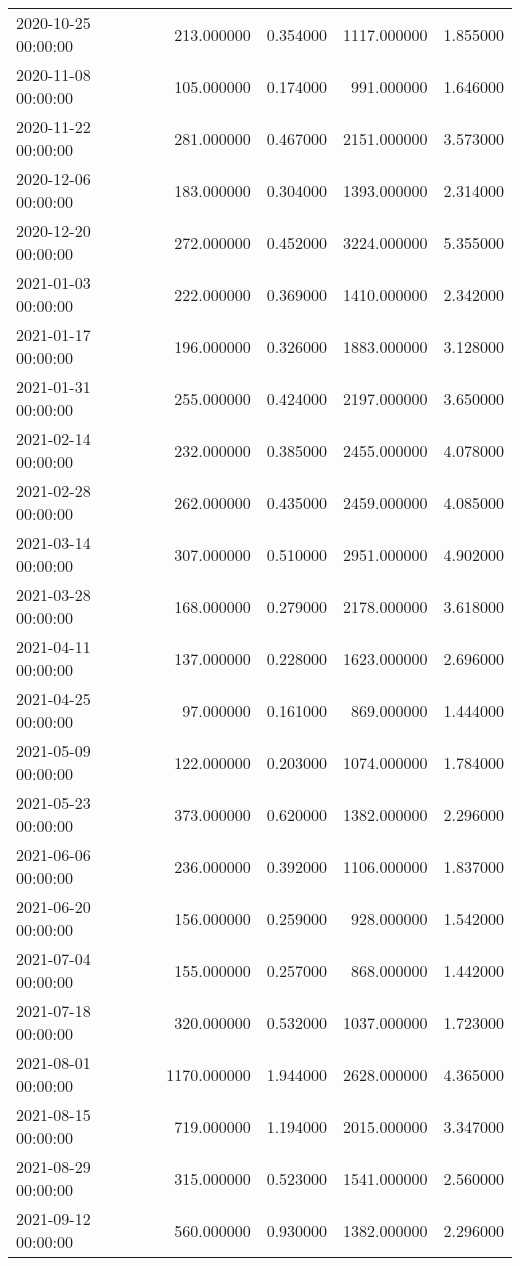 \begin{tabular}{lrrrr}
2020-10-25 00:00:00 & 213.000000 & 0.354000 & 1117.000000 & 1.855000 \\
2020-11-08 00:00:00 & 105.000000 & 0.174000 & 991.000000 & 1.646000 \\
2020-11-22 00:00:00 & 281.000000 & 0.467000 & 2151.000000 & 3.573000 \\
2020-12-06 00:00:00 & 183.000000 & 0.304000 & 1393.000000 & 2.314000 \\
2020-12-20 00:00:00 & 272.000000 & 0.452000 & 3224.000000 & 5.355000 \\
2021-01-03 00:00:00 & 222.000000 & 0.369000 & 1410.000000 & 2.342000 \\
2021-01-17 00:00:00 & 196.000000 & 0.326000 & 1883.000000 & 3.128000 \\
2021-01-31 00:00:00 & 255.000000 & 0.424000 & 2197.000000 & 3.650000 \\
2021-02-14 00:00:00 & 232.000000 & 0.385000 & 2455.000000 & 4.078000 \\
2021-02-28 00:00:00 & 262.000000 & 0.435000 & 2459.000000 & 4.085000 \\
2021-03-14 00:00:00 & 307.000000 & 0.510000 & 2951.000000 & 4.902000 \\
2021-03-28 00:00:00 & 168.000000 & 0.279000 & 2178.000000 & 3.618000 \\
2021-04-11 00:00:00 & 137.000000 & 0.228000 & 1623.000000 & 2.696000 \\
2021-04-25 00:00:00 & 97.000000 & 0.161000 & 869.000000 & 1.444000 \\
2021-05-09 00:00:00 & 122.000000 & 0.203000 & 1074.000000 & 1.784000 \\
2021-05-23 00:00:00 & 373.000000 & 0.620000 & 1382.000000 & 2.296000 \\
2021-06-06 00:00:00 & 236.000000 & 0.392000 & 1106.000000 & 1.837000 \\
2021-06-20 00:00:00 & 156.000000 & 0.259000 & 928.000000 & 1.542000 \\
2021-07-04 00:00:00 & 155.000000 & 0.257000 & 868.000000 & 1.442000 \\
2021-07-18 00:00:00 & 320.000000 & 0.532000 & 1037.000000 & 1.723000 \\
2021-08-01 00:00:00 & 1170.000000 & 1.944000 & 2628.000000 & 4.365000 \\
2021-08-15 00:00:00 & 719.000000 & 1.194000 & 2015.000000 & 3.347000 \\
2021-08-29 00:00:00 & 315.000000 & 0.523000 & 1541.000000 & 2.560000 \\
2021-09-12 00:00:00 & 560.000000 & 0.930000 & 1382.000000 & 2.296000 \\

\end{tabular}
